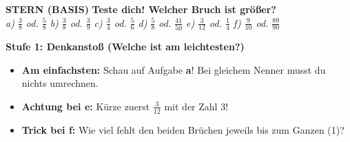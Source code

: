 \documentclass[a4paper,10pt]{article}
\newcommand{\mFrac}[2]{\frac{#1}{#2}}
\begin{document}
\begin{tcolorbox}[
    enhanced, colback=white, colframe=primaryBlue, arc=3mm, boxrule=1.2pt,
    left=4.5mm, right=4.5mm, top=2.5mm, bottom=2.5mm, height=12.9cm
]
    \begin{center}
        {\color{lvlGreen}\textbf{\faStar{} STERN (BASIS)}}\quad
        {\color{primaryBlue}\large\bfseries {}\quad Teste dich! Welcher Bruch ist größer?}\\[1mm]
        {\footnotesize\textit{a) $\mFrac{3}{8}$ od. $\mFrac{5}{8}$ \quad b) $\mFrac{3}{8}$ od. $\mFrac{3}{9}$ \quad c) $\mFrac{3}{4}$ od. $\mFrac{5}{6}$ \quad d) $\mFrac{5}{8}$ od. $\mFrac{41}{50}$ \quad e) $\mFrac{3}{12}$ od. $\mFrac{1}{4}$ \quad f) $\mFrac{9}{10}$ od. $\mFrac{89}{90}$}}
    \end{center}
    \vspace{0.5mm}

    \begin{tcolorbox}[colback=step1Bg, colframe=step1Border, arc=2mm, boxrule=0.7pt, left=3mm, right=3mm, top=1.8mm, bottom=1.8mm]
        {\color{step1Text}\bfseries\faLightbulb\enskip Stufe 1: Denkanstoß (Welche ist am leichtesten?)}\\[0.8mm]
        {\small
        \begin{itemize}[leftmargin=4mm, itemsep=0.2pt, topsep=1pt]
            \item \textbf{Am einfachsten:} Schau auf Aufgabe \textbf{a}! Bei gleichem Nenner musst du nichts umrechnen.
            \item \textbf{Achtung bei e:} Kürze zuerst $\mFrac{3}{12}$ mit der Zahl 3!
            \item \textbf{Trick bei f:} Wie viel fehlt den beiden Brüchen jeweils bis zum Ganzen (1)?
        \end{itemize}
        }
    \end{tcolorbox}
    \vspace{0.8mm}


\end{tcolorbox}
\end{document}
